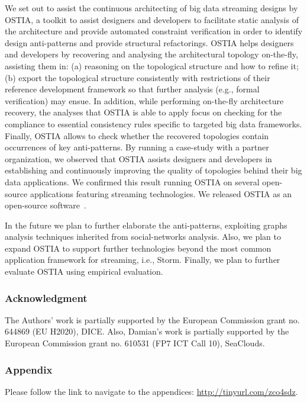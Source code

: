 We set out to assist the continuous architecting of big data streaming designs by OSTIA, a toolkit to assist designers and developers to facilitate static analysis of the architecture and provide automated constraint verification in order to identify design anti-patterns and provide structural refactorings. OSTIA helps designers and developers by recovering and analysing the architectural topology on-the-fly, assisting them in: (a) reasoning on the topological structure and how to refine it; (b) export the topological structure consistently with restrictions of their reference development framework so that further analysis (e.g., formal verification) may ensue. In addition, while performing on-the-fly architecture recovery, the analyses that OSTIA is able to apply focus on checking for the compliance to essential consistency rules specific to targeted big data frameworks. Finally, OSTIA allows to check whether the recovered topologies contain occurrences of key anti-patterns. By running a case-study with a partner organization, we observed that OSTIA assists designers and developers in establishing and continuously improving the quality of topologies behind their big data applications. We confirmed this result running OSTIA on several open-source applications featuring streaming technologies. We released OSTIA as an open-source software~\cite{ostia}. %
 
In the future we plan to further elaborate the anti-patterns, 
exploiting graphs analysis techniques inherited from social-networks analysis. Also, we plan to expand OSTIA to support further technologies beyond the most common application framework for streaming, i.e., Storm. Finally, we plan to further evaluate OSTIA using empirical evaluation.

{\small\subsubsection*{Acknowledgment} The Authors' work is partially supported by the European Commission grant no. 644869 (EU H2020), DICE. Also, Damian's work is partially supported by the European Commission grant no. 610531 (FP7 ICT Call 10), SeaClouds.}

{\small\subsubsection*{Appendix} Please follow the link to navigate to the appendices: \url{http://tinyurl.com/zco4sdz}.}